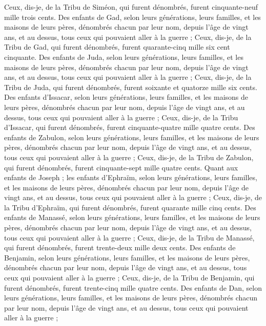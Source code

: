 \begin{multicols}{2}
Ceux, dis-je, de la Tribu de Siméon, qui furent dénombrés, furent cinquante-neuf mille trois cents.
Des enfants de Gad, selon leurs générations, leurs familles, et les maisons de leurs pères, dénombrés chacun par leur nom, depuis l'âge de vingt ans, et au dessus, tous ceux qui pouvaient aller à la guerre ;
Ceux, dis-je, de la Tribu de Gad, qui furent dénombrés, furent quarante-cinq mille six cent cinquante.
Des enfants de Juda, selon leurs générations, leurs familles, et les maisons de leurs pères, dénombrés chacun par leur nom, depuis l'âge de vingt ans, et au dessus, tous ceux qui pouvaient aller à la guerre ;
Ceux, dis-je, de la Tribu de Juda, qui furent dénombrés, furent soixante et quatorze mille six cents.
Des enfants d'Issacar, selon leurs générations, leurs familles, et les maisons de leurs pères, dénombrés chacun par leur nom, depuis l'âge de vingt ans, et au dessus, tous ceux qui pouvaient aller à la guerre ;
Ceux, dis-je, de la Tribu d'Issacar, qui furent dénombrés, furent cinquante-quatre mille quatre cents.
Des enfants de Zabulon, selon leurs générations, leurs familles, et les maisons de leurs pères, dénombrés chacun par leur nom, depuis l'âge de vingt ans, et au dessus, tous ceux qui pouvaient aller à la guerre ;
Ceux, dis-je, de la Tribu de Zabulon, qui furent dénombrés, furent cinquante-sept mille quatre cents.
Quant aux enfants de Joseph ; les enfants d'Ephraïm, selon leurs générations, leurs familles, et les maisons de leurs pères, dénombrés chacun par leur nom, depuis l'âge de vingt ans, et au dessus, tous ceux qui pouvaient aller à la guerre ;
Ceux, dis-je, de la Tribu d'Ephraïm, qui furent dénombrés, furent quarante mille cinq cents.
Des enfants de Manassé, selon leurs générations, leurs familles, et les maisons de leurs pères, dénombrés chacun par leur nom, depuis l'âge de vingt ans, et au dessus, tous ceux qui pouvaient aller à la guerre ;
Ceux, dis-je, de la Tribu de Manassé, qui furent dénombrés, furent trente-deux mille deux cents.
Des enfants de Benjamin, selon leurs générations, leurs familles, et les maisons de leurs pères, dénombrés chacun par leur nom, depuis l'âge de vingt ans, et au dessus, tous ceux qui pouvaient aller à la guerre ;
Ceux, dis-je, de la Tribu de Benjamin, qui furent dénombrés, furent trente-cinq mille quatre cents.
Des enfants de Dan, selon leurs générations, leurs familles, et les maisons de leurs pères, dénombrés chacun par leur nom, depuis l'âge de vingt ans, et au dessus, tous ceux qui pouvaient aller à la guerre ;

\end{multicols}
